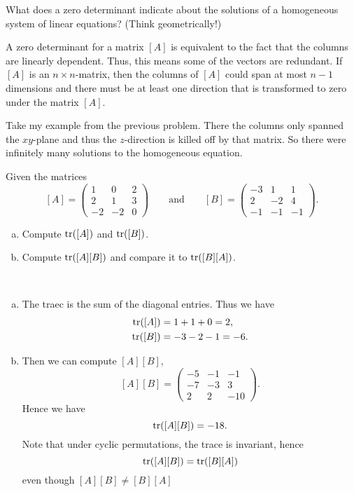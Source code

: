 \documentclass[12pt]{article} %
\begin{document}
\newpage
\begin{problem}
What does a zero determinant indicate about the solutions of a homogeneous system of linear equations? (Think geometrically!)
\end{problem}
\begin{solution}
A zero determinant for a matrix $[A]$ is equivalent to the fact that the columns are linearly dependent. Thus, this means some of the vectors are redundant. If $[A]$ is an $n\times n$-matrix, then the columns of $[A]$ could span at most $n-1$ dimensions and there must be at least one direction that is transformed to zero under the matrix $[A]$.

Take my example from the previous problem.  There the columns only spanned the $xy$-plane and thus the $z$-direction is killed off by that matrix.  So there were infinitely many solutions to the homogeneous equation.
\end{solution}

\newpage
\begin{problem}
Given the matrices
\[
[A]=\begin{pmatrix} 1 & 0 & 2 \\ 2  & 1 & 3 \\ -2 & -2 & 0 \end{pmatrix} \qquad \textrm{and} \qquad [B]=\begin{pmatrix} -3 & 1 & 1 \\ 2 & -2 & 4 \\ -1 & -1 & -1 \end{pmatrix}.
\]
\begin{enumerate}[(a)]
    \item Compute $\mathrm{tr}([A])$ and $\mathrm{tr}([B])$.  
    \item Compute $\mathrm{tr}([A][B])$ and compare it to $\mathrm{tr}([B][A])$.
\end{enumerate}
\end{problem}
\begin{solution}~
\begin{enumerate}[(a)]
    \item The traec is the sum of the diagonal entries. Thus we have
    \begin{align*}
        \mathrm{tr}([A])&=1+1+0=2,\\
        \mathrm{tr}([B])&=-3-2-1=-6.
    \end{align*}
    \item Then we can compute $[A][B]$,
    \[
    [A][B]=\begin{pmatrix}
    -5 & -1 & -1 \\ -7 & -3 & 3 \\ 2 & 2 & -10
    \end{pmatrix}.
    \]
    Hence we have
    \[
    \mathrm{tr}([A][B]) = -18.
    \]
    Note that under cyclic permutations, the trace is invariant, hence
    \[
    \mathrm{tr}([A][B])=\mathrm{tr}([B][A])
    \]
    even though $[A][B]\neq [B][A]$
    
\end{enumerate}
\end{solution}
\end{document}
